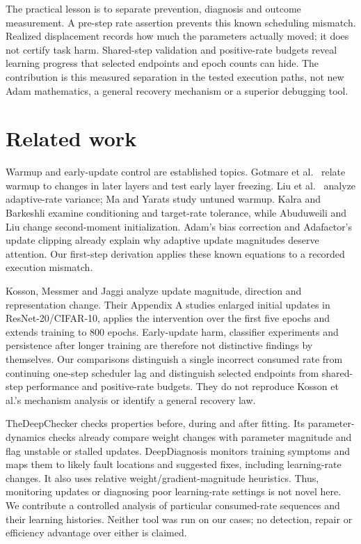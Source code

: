 \documentclass[referee,pdflatex,sn-mathphys-num]{sn-jnl}
\begin{document}
The practical lesson is to separate prevention, diagnosis and outcome measurement. A pre-step rate assertion prevents this known scheduling mismatch. Realized displacement records how much the parameters actually moved; it does not certify task harm. Shared-step validation and positive-rate budgets reveal learning progress that selected endpoints and epoch counts can hide. The contribution is this measured separation in the tested execution paths, not new Adam mathematics, a general recovery mechanism or a superior debugging tool.

\section{Related work}\label{related-work}

Warmup and early-update control are established topics. Gotmare et al.~\citep{gotmare2019heuristics} relate warmup to changes in later layers and test early layer freezing. Liu et al.~\citep{liu2020variance} analyze adaptive-rate variance; Ma and Yarats \citep{ma2021untuned} study untuned warmup. Kalra and Barkeshli \citep{kalra2024warmup} examine conditioning and target-rate tolerance, while Abuduweili and Liu \citep{abuduweili2025initial} change second-moment initialization. Adam's bias correction \citep{kingma2015adam} and Adafactor's update clipping \citep{shazeer2018adafactor} already explain why adaptive update magnitudes deserve attention. Our first-step derivation applies these known equations to a recorded execution mismatch.

Kosson, Messmer and Jaggi \citep{kosson2024warmup} analyze update magnitude, direction and representation change. Their Appendix A studies enlarged initial updates in ResNet-20/CIFAR-10, applies the intervention over the first five epochs and extends training to 800 epochs. Early-update harm, classifier experiments and persistence after longer training are therefore not distinctive findings by themselves. Our comparisons distinguish a single incorrect consumed rate from continuing one-step scheduler lag and distinguish selected endpoints from shared-step performance and positive-rate budgets. They do not reproduce Kosson et al.'s mechanism analysis or identify a general recovery law.

TheDeepChecker \citep{benbraiek2023deepchecker} checks properties before, during and after fitting. Its parameter-dynamics checks already compare weight changes with parameter magnitude and flag unstable or stalled updates. DeepDiagnosis \citep{wardat2022deepdiagnosis} monitors training symptoms and maps them to likely fault locations and suggested fixes, including learning-rate changes. It also uses relative weight/gradient-magnitude heuristics. Thus, monitoring updates or diagnosing poor learning-rate settings is not novel here. We contribute a controlled analysis of particular consumed-rate sequences and their learning histories. Neither tool was run on our cases; no detection, repair or efficiency advantage over either is claimed.
\end{document}
